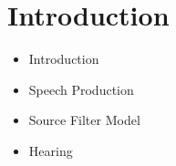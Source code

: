 \setcounter{chapter}{0}
\chapter{Introduction}
\thispagestyle{plain}



\begin{corollary}

	\hspace*{10mm}
	
	\vspace{5mm} %
	
	\begin{itemize}
			\item Introduction
			\item Speech Production
			\item Source Filter Model
			\item Hearing
	\end{itemize}
\end{corollary}

\clearpage











